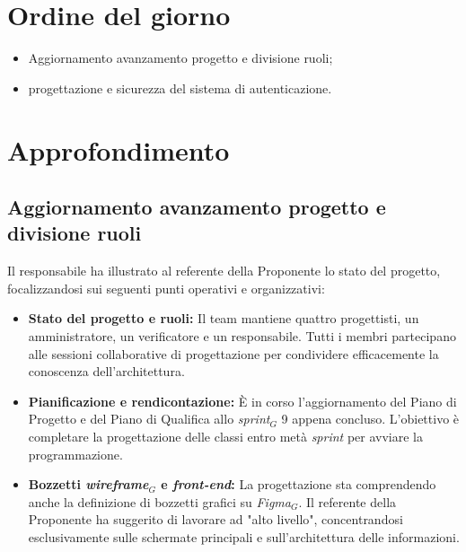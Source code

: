 \documentclass[10pt, letterpaper]{article}
\begin{document}
\makeTitlePage


\newpage

\tableofcontents

\newpage


\makeMeetingParticipantsTable

\section{Ordine del giorno}
\begin{itemize}
  \item Aggiornamento avanzamento progetto e divisione ruoli;
  \item progettazione e sicurezza del sistema di autenticazione.
\end{itemize}

\section{Approfondimento}

\subsection{Aggiornamento avanzamento progetto e divisione ruoli}
Il responsabile ha illustrato al referente della Proponente lo stato del progetto, focalizzandosi
sui seguenti punti operativi e organizzativi:
\begin{itemize}
  \item \textbf{Stato del progetto e ruoli:} Il team mantiene quattro progettisti, un amministratore, un verificatore e un responsabile.
        Tutti i membri partecipano alle sessioni collaborative di progettazione per condividere efficacemente la conoscenza dell'architettura.
  \item \textbf{Pianificazione e rendicontazione:} È in corso l'aggiornamento del Piano di Progetto e del Piano di Qualifica
        allo \textit{sprint$_G$} 9 appena concluso. L'obiettivo è completare la progettazione delle classi entro metà \textit{sprint} per avviare la programmazione.
  \item \textbf{Bozzetti {\textit{wireframe$_G$} e \textit{front-end}:}} La progettazione sta comprendendo anche la definizione di bozzetti grafici su \textit{Figma$_G$}.
        Il referente della Proponente ha suggerito di lavorare ad "alto livello", concentrandosi esclusivamente sulle schermate principali e sull'architettura delle informazioni.
\end{itemize}
\end{document}

